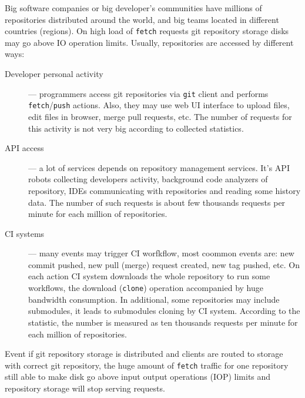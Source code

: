 \documentclass[nonacm=true]{acmart}
\newcommand{\code}[1]{\texttt{#1}}
\begin{document}
Big software companies or big developer's communities have
millions of repositories distributed around the world, and big teams located in different countries
(regions). On high load of \code{fetch} requests git repository storage disks may go above IO operation limits.
Usually, repositories are accessed by different ways:
\begin{description}
  \item[Developer personal activity] --- programmers access git repositories via
    \code{git} client and performs \code{fetch}/\code{push} actions. Also, they
    may use web UI interface to upload files, edit files in browser, merge pull requests, etc.
    The number of requests for this activity is not very big according to collected statistics.
  \item[API access] --- a lot of services depends on repository management services. It's API robots
    collecting developers activity, background code analyzers of repository, IDEs communicating
    with repositories and reading some history data. The number of such requests is about
    few thousands requests per minute for each million of repositories.
  \item[CI systems] --- many events may trigger CI worfkflow, most coommon events are:
    new commit pushed, new pull (merge) request created, new tag pushed, etc.
    On each action CI system downloads the whole repository to run some workflows,
    the download (\code{clone}) operation accompanied by huge bandwidth consumption.
    In additional, some repositories may include submodules, it leads to submodules cloning by CI
    system. According to the statistic, the number is measured as ten thousands requests per minute
    for each million of repositories.
\end{description}

Event if git repository storage is distributed and clients are routed to storage with
correct git repository, the huge amount of \code{fetch} traffic for one repository still able to
make disk go above input output operations (IOP) limits and repository storage will stop
serving requests.
\end{document}
